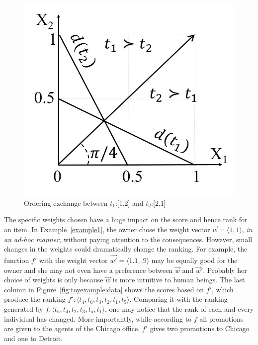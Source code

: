 \begin{figure}[!tb]
\hfill
\begin{minipage}[t]{0.25\textwidth}
\centering
    \includegraphics[width=\textwidth]{figs/orderingexchange.jpg}
    \vspace{-10mm}\caption{Ordering exchange between $t_1$:[1,2] and $t_2$:[2,1]}
    \label{fig:orderingexchange}
\end{minipage}
\vspace{-8mm}
\end{figure}

The specific weights chosen have a huge impact on the score and hence rank for an item.
In Example~\ref{example1}, the owner chose the weight vector $\vec{w}=\langle 1, 1 \rangle$, {\em in an ad-hoc manner}, without paying attention to the consequences.
However, small changes in the weights could dramatically change the ranking. 
For example, the function $f'$ with the weight vector $\vec{w'}=\langle 1.1, .9 \rangle$ may be equally good for the owner and she may not even have a preference between $\vec{w}$ and $\vec{w}'$. Probably her choice of weights is only because $\vec{w}$ is more intuitive to human beings.
The last column in Figure~\ref{fig:toyexample:data} shows the scores based on $f'$, which produce the ranking $f': \langle t_4, t_6, t_3, t_2, t_1, t_5\rangle$. Comparing it with the ranking generated by $f:  \langle t_6, t_4, t_2, t_3, t_5, t_1\rangle$, one may notice that the rank of each and every individual has changed. More importantly, while according to $f$ all promotions are given to the agents of the Chicago office, $f'$ gives two promotions to Chicago and one to Detroit.

